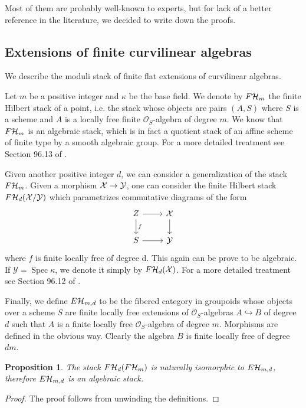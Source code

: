 \documentclass{alggeom}
\numberwithin{equation}{section}
\numberwithin{subsection}{section}
\newtheorem{proposition}[theorem]{Proposition}
\theoremstyle{definition}
\theoremstyle{remark}
\newcommand\cO{\mathcal{O}} \newcommand\cP{\mathcal{P}}
\newcommand\cY{\mathcal{Y}} \newcommand\cZ{\mathcal{Z}}
\newcommand\into{\hookrightarrow}
\newcommand\spec{\operatorname{Spec}}
\begin{document}
Most of them are probably well-known to experts, but for lack of a better reference in the literature, we decided to write down the proofs.

\subsection{Extensions of finite curvilinear algebras}\label{sub:3.1}

We describe the moduli stack of finite flat extensions of curvilinear algebras.  

Let $m$ be a positive integer and $\kappa$ be the base field. We denote by $F\mathcal{H}_m$ the finite Hilbert stack of a point, i.e. the stack whose objects are pairs $(A,S)$ where $S$ is a scheme and $A$ is a locally free finite $\cO_S$-algebra of degree $m$. We know that $F\mathcal{H}_m$ is an algebraic stack, which is in fact a quotient stack of an affine scheme of finite type by a smooth algebraic group. For a more detailed treatment see Section 96.13 of \cite{StProj}. 

Given another positive integer $d$, we can consider a generalization of the stack $F\mathcal{H}_m$. Given a morphism $\cX \rightarrow \cY$, one can consider the finite Hilbert stack $F\cH_d(\cX/\cY)$ which parametrizes commutative diagrams of the form
$$
\begin{tikzcd}
	Z \arrow[r] \arrow[d, "f"] & \cX \arrow[d] \\
	S \arrow[r]                & \cY          
\end{tikzcd}
$$
where $f$ is finite locally free of degree d. This again can be prove to be algebraic. If $\cY=\spec \kappa$, we denote it simply by $F\mathcal{H}_d(\mathcal{X})$. For a more detailed treatment see Section 96.12 of \cite{StProj}.

Finally, we define $E\mathcal{H}_{m,d}$ to be the fibered category in groupoids whose objects over a scheme $S$ are finite locally free extensions of $\cO_S$-algebras $A \into B$  of degree $d$ such that $A$ is a finite locally free $\cO_S$-algebra of degree $m$. Morphisms are defined in the obvious way. Clearly the algebra $B$ is finite locally free of degree $dm$. 

\begin{proposition}
	The stack $F\mathcal{H}_{d}(F\mathcal{H}_m)$ is naturally isomorphic to $E\mathcal{H}_{m,d}$, therefore $E\mathcal{H}_{m,d}$ is an algebraic stack.
\end{proposition}

\begin{proof}
	The proof follows from unwinding the definitions.
\end{proof}
\end{document}
